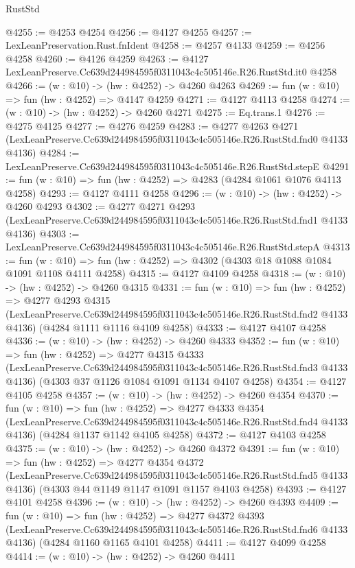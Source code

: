 \begin{lexlean}{RustStd}
\begin{coremodule}
@4255 := @4253 @4254
@4256 := @4127 @4255
@4257 := LexLeanPreservation.Rust.fnIdent
@4258 := @4257 @4133
@4259 := @4256 @4258
@4260 := @4126 @4259
@4263 := @4127 LexLeanPreserve.Cc639d244984595f0311043c4c505146e.R26.RustStd.it0 @4258
@4266 := (w : @10) -> (hw : @4252) -> @4260 @4263
@4269 := fun (w : @10) => fun (hw : @4252) => @4147 @4259
@4271 := @4127 @4113 @4258
@4274 := (w : @10) -> (hw : @4252) -> @4260 @4271
@4275 := Eq.trans.{1}
@4276 := @4275 @4125
@4277 := @4276 @4259
@4283 := @4277
    @4263
    @4271
    (LexLeanPreserve.Cc639d244984595f0311043c4c505146e.R26.RustStd.fnd0 @4133 @4136)
@4284 := LexLeanPreserve.Cc639d244984595f0311043c4c505146e.R26.RustStd.stepE
@4291 := fun (w : @10) => fun (hw : @4252) => @4283 (@4284 @1061 @1076 @4113 @4258)
@4293 := @4127 @4111 @4258
@4296 := (w : @10) -> (hw : @4252) -> @4260 @4293
@4302 := @4277
    @4271
    @4293
    (LexLeanPreserve.Cc639d244984595f0311043c4c505146e.R26.RustStd.fnd1 @4133 @4136)
@4303 := LexLeanPreserve.Cc639d244984595f0311043c4c505146e.R26.RustStd.stepA
@4313 := fun (w : @10) => fun (hw : @4252) => @4302 (@4303 @18 @1088 @1084 @1091 @1108 @4111 @4258)
@4315 := @4127 @4109 @4258
@4318 := (w : @10) -> (hw : @4252) -> @4260 @4315
@4331 := fun (w : @10) =>
  fun (hw : @4252) =>
  @4277
    @4293
    @4315
    (LexLeanPreserve.Cc639d244984595f0311043c4c505146e.R26.RustStd.fnd2 @4133 @4136)
    (@4284 @1111 @1116 @4109 @4258)
@4333 := @4127 @4107 @4258
@4336 := (w : @10) -> (hw : @4252) -> @4260 @4333
@4352 := fun (w : @10) =>
  fun (hw : @4252) =>
  @4277
    @4315
    @4333
    (LexLeanPreserve.Cc639d244984595f0311043c4c505146e.R26.RustStd.fnd3 @4133 @4136)
    (@4303 @37 @1126 @1084 @1091 @1134 @4107 @4258)
@4354 := @4127 @4105 @4258
@4357 := (w : @10) -> (hw : @4252) -> @4260 @4354
@4370 := fun (w : @10) =>
  fun (hw : @4252) =>
  @4277
    @4333
    @4354
    (LexLeanPreserve.Cc639d244984595f0311043c4c505146e.R26.RustStd.fnd4 @4133 @4136)
    (@4284 @1137 @1142 @4105 @4258)
@4372 := @4127 @4103 @4258
@4375 := (w : @10) -> (hw : @4252) -> @4260 @4372
@4391 := fun (w : @10) =>
  fun (hw : @4252) =>
  @4277
    @4354
    @4372
    (LexLeanPreserve.Cc639d244984595f0311043c4c505146e.R26.RustStd.fnd5 @4133 @4136)
    (@4303 @44 @1149 @1147 @1091 @1157 @4103 @4258)
@4393 := @4127 @4101 @4258
@4396 := (w : @10) -> (hw : @4252) -> @4260 @4393
@4409 := fun (w : @10) =>
  fun (hw : @4252) =>
  @4277
    @4372
    @4393
    (LexLeanPreserve.Cc639d244984595f0311043c4c505146e.R26.RustStd.fnd6 @4133 @4136)
    (@4284 @1160 @1165 @4101 @4258)
@4411 := @4127 @4099 @4258
@4414 := (w : @10) -> (hw : @4252) -> @4260 @4411

\end{coremodule}
\end{lexlean}
